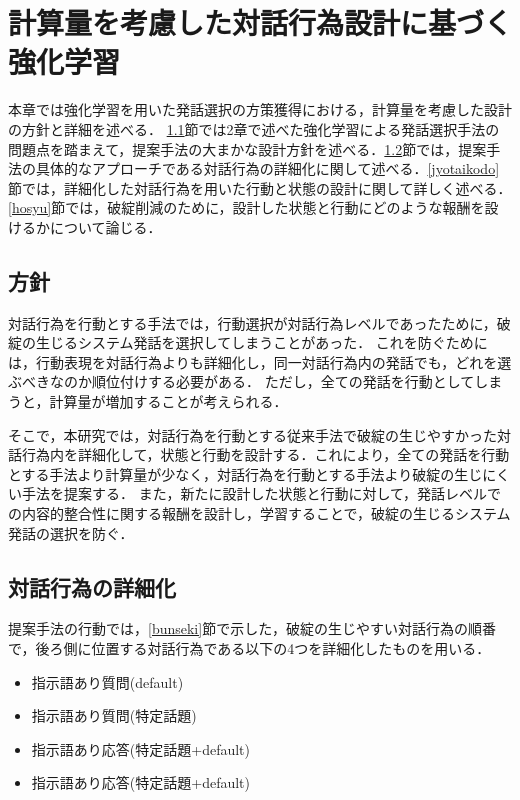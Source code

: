 \documentclass[12pt,a4paper,twoside,openany]{jbook}
\begin{document}
\chapter{計算量を考慮した対話行為設計に基づく強化学習}
本章では強化学習を用いた発話選択の方策獲得における，計算量を考慮した設計の方針と詳細を述べる．
\ref{houshin}節では2章で述べた強化学習による発話選択手法の問題点を踏まえて，提案手法の大まかな設計方針を述べる．\ref{syosaika}節では，提案手法の具体的なアプローチである対話行為の詳細化に関して述べる．\ref{jyotaikodo}節では，詳細化した対話行為を用いた行動と状態の設計に関して詳しく述べる．\ref{hosyu}節では，破綻削減のために，設計した状態と行動にどのような報酬を設けるかについて論じる．

\section{方針}\label{houshin}

対話行為を行動とする手法では，行動選択が対話行為レベルであったために，破綻の生じるシステム発話を選択してしまうことがあった．
これを防ぐためには，行動表現を対話行為よりも詳細化し，同一対話行為内の発話でも，どれを選ぶべきなのか順位付けする必要がある．
ただし，全ての発話を行動としてしまうと，計算量が増加することが考えられる．

そこで，本研究では，対話行為を行動とする従来手法\cite{nishimoto2}で破綻の生じやすかった対話行為内を詳細化して，状態と行動を設計する．これにより，全ての発話を行動とする手法より計算量が少なく，対話行為を行動とする手法より破綻の生じにくい手法を提案する．
また，新たに設計した状態と行動に対して，発話レベルでの内容的整合性に関する報酬を設計し，学習することで，破綻の生じるシステム発話の選択を防ぐ．

\section{対話行為の詳細化}\label{syosaika}
提案手法の行動では，\ref{bunseki}節で示した，破綻の生じやすい対話行為の順番で，後ろ側に位置する対話行為である以下の4つを詳細化したものを用いる．
\begin{itemize}
    \item 指示語あり質問(default)
    \item 指示語あり質問(特定話題)
    \item 指示語あり応答(特定話題+default)
    \item 指示語あり応答(特定話題+default)
\end{itemize}
\end{document}
